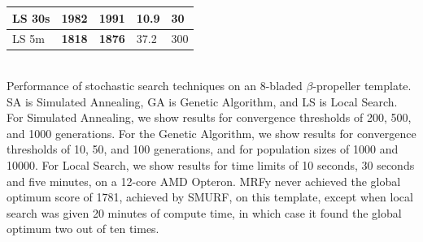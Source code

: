 \documentclass{acm_proc_article-sp}
\begin{document}
\begin{small}
\begin{center}
\begin{table}[htb]
\begin{tabular}{lllll}
LS 30s       & 1982     & 1991      & 10.9     & 30    \\
\hline                                                        
LS 5m        & \textbf{1818}     & \textbf{1876}      & 37.2     & 300    \\
\hline
\end{tabular}\\
{Performance of stochastic search techniques on an 8-bladed $\beta$-propeller
template. SA is Simulated Annealing, GA is Genetic Algorithm, and LS is Local
Search. For Simulated Annealing, we show results for convergence thresholds of
200, 500, and 1000 generations. 
For the Genetic Algorithm, we show results for convergence thresholds of 10, 
50, and 100 generations, and for population sizes of 1000 and 10000.
For Local Search, we show results for time limits of 10 seconds, 30 seconds and 
five minutes, on a 12-core AMD Opteron.
MRFy never achieved the global optimum score of 1781, achieved by SMURF, on this
template, except when local search was given 20 minutes of compute time, in
which case it found the global optimum two out of ten times.}
\end{table}
\end{center}
\end{small}
\end{document}
